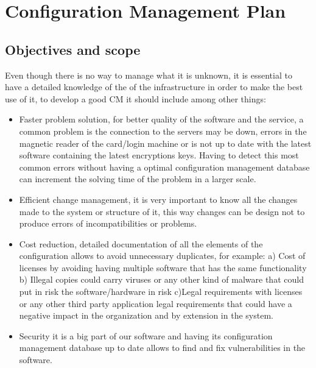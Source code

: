 \renewcommand{\headrulewidth}{0.1pt}
\renewcommand{\footrulewidth}{0.1pt}

\section*{Configuration Management Plan}

\subsection*{Objectives and scope}

Even though there is no way to manage what it is unknown, it is essential to have a detailed knowledge of the of the infrastructure in order to make the best use of it, to develop a good CM it should include among other things:

\begin{itemize}
	\item Faster problem solution, for better quality of the software and the service, a common problem is the connection to the servers may be down, errors in the magnetic reader of the card/login machine or is not up to date with the latest software containing the latest encryptions keys. Having to detect this most common errors without having a optimal configuration management database can increment the solving time of the problem in a larger scale.
	
	\item Efficient change management, it is very important to know all the changes made to the system or structure of it, this way changes can be design not to produce errors of incompatibilities or problems.
	
	\item Cost reduction, detailed documentation of all the elements of the configuration allows to avoid unnecessary duplicates, for example: a) Cost of licenses by avoiding having multiple software that has the same functionality b) Illegal copies could carry viruses or any other kind of malware that could put in risk the software/hardware in risk c)Legal requirements with licenses or any other third party application legal requirements that could have a negative impact in the organization and by extension in the system.
	
	\item Security it is a big part of our software and having its configuration management database up to date allows to find and fix vulnerabilities in the software.
\end{itemize}
												
